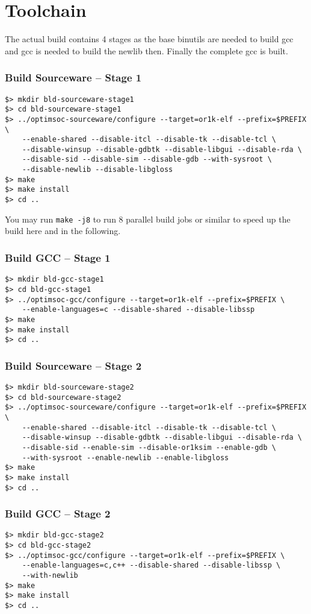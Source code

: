 \chapter{Toolchain}
\label{chap:toolchain}


The actual build contains 4 stages as the base binutils are needed to
build gcc and gcc is needed to build the newlib then. Finally the
complete gcc is built.

\subsection{Build Sourceware -- Stage 1}

\begin{lstlisting}
$> mkdir bld-sourceware-stage1
$> cd bld-sourceware-stage1
$> ../optimsoc-sourceware/configure --target=or1k-elf --prefix=$PREFIX \
    --enable-shared --disable-itcl --disable-tk --disable-tcl \
    --disable-winsup --disable-gdbtk --disable-libgui --disable-rda \
    --disable-sid --disable-sim --disable-gdb --with-sysroot \
    --disable-newlib --disable-libgloss
$> make
$> make install
$> cd ..
\end{lstlisting}

You may run \verb|make -j8| to run 8 parallel build jobs or similar to
speed up the build here and in the following.

\subsection{Build GCC -- Stage 1}

\begin{lstlisting}
$> mkdir bld-gcc-stage1
$> cd bld-gcc-stage1
$> ../optimsoc-gcc/configure --target=or1k-elf --prefix=$PREFIX \
    --enable-languages=c --disable-shared --disable-libssp
$> make
$> make install
$> cd ..
\end{lstlisting}

\subsection{Build Sourceware -- Stage 2}

\begin{lstlisting}
$> mkdir bld-sourceware-stage2
$> cd bld-sourceware-stage2
$> ../optimsoc-sourceware/configure --target=or1k-elf --prefix=$PREFIX \
    --enable-shared --disable-itcl --disable-tk --disable-tcl \
    --disable-winsup --disable-gdbtk --disable-libgui --disable-rda \
    --disable-sid --enable-sim --disable-or1ksim --enable-gdb \
    --with-sysroot --enable-newlib --enable-libgloss
$> make
$> make install
$> cd ..
\end{lstlisting}

\subsection{Build GCC -- Stage 2}

\begin{lstlisting}
$> mkdir bld-gcc-stage2
$> cd bld-gcc-stage2
$> ../optimsoc-gcc/configure --target=or1k-elf --prefix=$PREFIX \
    --enable-languages=c,c++ --disable-shared --disable-libssp \
    --with-newlib
$> make
$> make install
$> cd ..
\end{lstlisting}

